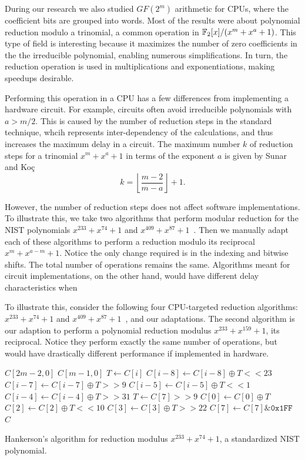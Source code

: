 During our research we also studied $GF(2^m)$ arithmetic for CPUs, where the coefficient bits are grouped into words. Most of the results were about polynomial reduction modulo a trinomial, a common operation in $\mathbb{F}_2[x]/(x^m+x^a+1)$. This type of field is interesting because it maximizes the number of zero coefficients in the the irreducible polynomial, enabling numerous simplifications. In turn, the reduction operation is used in multiplications and exponentiations, making speedups desirable.

Performing this operation in a CPU has a few differences from implementing a hardware circuit. For example, circuits often avoid irreducible polynomials with $a > m/2$. This is caused by the number of reduction steps in the standard technique, whcih represents inter-dependency of the calculations, and thus increases the maximum delay in a circuit. The maximum number $k$ of reduction steps for a trinomial 
$x^{m} + x^{a} + 1$ in terms of the exponent 
$a$ is given by Sunar and Ko\c{c} \cite{sunar1999mastrovito}
\begin{equation} \label{eq:k}
  k = \left \lfloor \frac{m-2}{m-a} \right \rfloor + 1.
\end{equation}

However, the number of reduction steps does not affect software implementations. To illustrate this, we take two algorithms that perform modular reduction for the NIST polynomials $x^{233} + x^{74} + 1$ and $x^{409} + x^{87} + 1$~\cite[p. 55]{hankerson2006guide}. Then we manually adapt each of these algorithms to perform a reduction modulo its reciprocal $x^m + x^{a-m} + 1$. Notice the only change required is in the indexing and bitwise shifts. The total number of operations remains the same. Algorithms meant for circuit implementations, on the other hand, would have different delay characteristics when 

To illustrate this, consider the following four CPU-targeted reduction algorithms: $x^{233} + x^{74} + 1$ and $x^{409} + x^{87} + 1$~\cite[p. 55]{hankerson2006guide}, and our adaptations. The second algorithm is our adaption to perform a polynomial reduction modulus $x^{233} + x^{159} + 1$, its reciprocal. Notice they perform exactly the same number of operations, but would have drastically different performance if implemented in hardware.


\begin{algorithm}
\begin{algorithmic}[1]
  \REQUIRE $C[2m-2,0]$
  \ENSURE $C[m-1,0]$
    \STATE $T \gets C[i]$
    \STATE $C[i-8] \gets C[i-8] \oplus T << 23$
    \STATE $C[i-7] \gets C[i-7] \oplus T >> 9$
    \STATE $C[i-5] \gets C[i-5] \oplus T << 1$
    \STATE $C[i-4] \gets C[i-4] \oplus T >> 31$
  \ENDFOR
  \STATE $T \gets C[7] >> 9$
  \STATE $C[0] \gets C[0] \oplus T$
  \STATE $C[2] \gets C[2] \oplus T << 10$
  \STATE $C[3] \gets C[3] \oplus T >> 22$
  \STATE $C[7] \gets C[7] \& \texttt{0x1FF}$
  \RETURN $C$
  \caption{Hankerson's algorithm for reduction modulus $x^{233} + x^{74} + 1$, a standardized NIST polynomial.}
  \label{alg:233_74_nist}
\end{algorithmic}
\end{algorithm}

